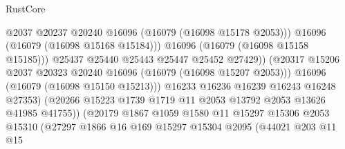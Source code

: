 \begin{lexlean}{RustCore}
\begin{coremodule}
                                            @2037
                                            @20237
                                            @20240
                                            @16096
                                            (@16079 (@16098 @15178 @2053)))
                                          @16096
                                          (@16079 (@16098 @15168 @15184)))
                                        @16096
                                        (@16079 (@16098 @15158 @15185)))
                                      @25437
                                      @25440
                                      @25443
                                      @25447
                                      @25452
                                      @27429))
                                  (@20317
                                    @15206
                                    @2037
                                    @20323
                                    @20240
                                    @16096
                                    (@16079 (@16098 @15207 @2053)))
                                  @16096
                                  (@16079 (@16098 @15150 @15213)))
                                @16233
                                @16236
                                @16239
                                @16243
                                @16248
                                @27353)
                              (@20266
                                @15223
                                @1739
                                @1719
                                @11
                                @2053
                                @13792
                                @2053
                                @13626
                                @41985
                                @41755))
                            (@20179
                              @1867
                              @1059
                              @1580
                              @11
                              @15297
                              @15306
                              @2053
                              @15310
                              (@27297
                                @1866
                                @16
                                @169
                                @15297
                                @15304
                                @2095
                                (@44021
                                  @203
                                  @11
                                  @15

\end{coremodule}
\end{lexlean}
